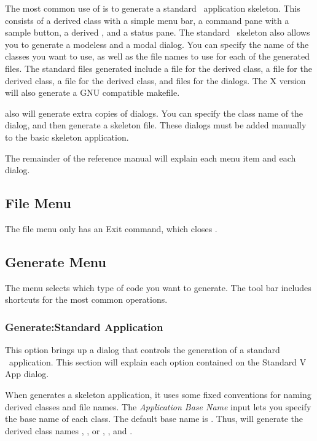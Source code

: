 The most common use of  is to generate a standard \V\
application skeleton. This consists of a derived 
class with a simple menu bar, a command pane with a sample
button, a derived , and a status pane. The
standard \V\ skeleton also allows you to generate a modeless and
a modal dialog. You can specify the name of the classes
you want to use, as well as the file names to use for each
of the generated files. The standard files generated include
a file for the derived  class, a file for the
derived  class, a file for the derived
 class, and files for the dialogs.
The X version will also generate a GNU compatible makefile.

 also will generate extra copies of dialogs.
You can specify the class name of the dialog, and then
generate a skeleton file. These dialogs must be added
manually to the basic skeleton application.

The remainder of the reference manual will explain each
menu item and each dialog.

\subsection{File Menu}

The file menu only has an Exit command, which closes
.

\subsection{Generate Menu}

The  menu selects which type of code you
want to generate. The  tool bar includes
shortcuts for the most common operations.

\subsubsection*{Generate:Standard Application}

This option brings up a dialog that controls the
generation of a standard \V\ application. This section
will explain each option contained on the Standard
V App dialog.

When  generates a skeleton application, it
uses some fixed conventions for naming derived classes and
file names. The \emph{Application Base Name} input lets
you specify the base name of each class. The default
base name is . Thus,  will generate
the derived class names , ,
 or , 
, and .

